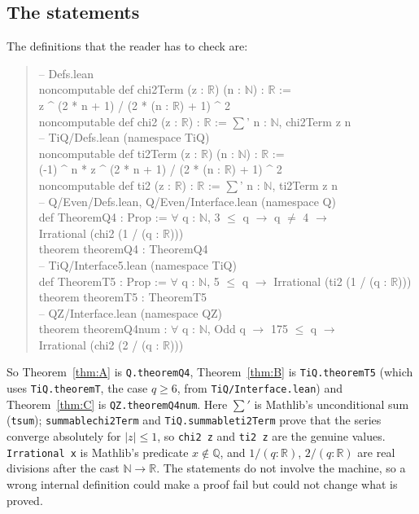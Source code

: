\documentclass[11pt]{amsart}
\theoremstyle{definition}
\theoremstyle{remark}
\numberwithin{equation}{section}
\newcommand{\NN}{\mathbb{N}}
\newcommand{\QQ}{\mathbb{Q}}
\newcommand{\RR}{\mathbb{R}}
\newcommand{\lean}[1]{{\def\_{\textunderscore\allowbreak}\texttt{#1}}}
\begin{document}
\subsection{The statements}
The definitions that the reader has to check are:
\begin{quote}\ttfamily\footnotesize
-- Defs.lean\\
noncomputable def chi2Term (z : $\mathbb{R}$) (n : $\mathbb{N}$) : $\mathbb{R}$ :=\\
\hspace*{2em}z \^{} (2 * n + 1) / (2 * (n : $\mathbb{R}$) + 1) \^{} 2\\
noncomputable def chi2 (z : $\mathbb{R}$) : $\mathbb{R}$ := $\sum$' n : $\mathbb{N}$, chi2Term z n\\[2pt]
-- TiQ/Defs.lean (namespace TiQ)\\
noncomputable def ti2Term (z : $\mathbb{R}$) (n : $\mathbb{N}$) : $\mathbb{R}$ :=\\
\hspace*{2em}(-1) \^{} n * z \^{} (2 * n + 1) / (2 * (n : $\mathbb{R}$) + 1) \^{} 2\\
noncomputable def ti2 (z : $\mathbb{R}$) : $\mathbb{R}$ := $\sum$' n : $\mathbb{N}$, ti2Term z n\\[2pt]
-- Q/Even/Defs.lean, Q/Even/Interface.lean (namespace Q)\\
def TheoremQ4 : Prop := $\forall$ q : $\mathbb{N}$, 3 $\le$ q $\to$ q $\ne$ 4 $\to$\\
\hspace*{2em}Irrational (chi2 (1 / (q : $\mathbb{R}$)))\\
theorem theoremQ4 : TheoremQ4\\[2pt]
-- TiQ/Interface5.lean (namespace TiQ)\\
def TheoremT5 : Prop := $\forall$ q : $\mathbb{N}$, 5 $\le$ q $\to$ Irrational (ti2 (1 / (q : $\mathbb{R}$)))\\
theorem theoremT5 : TheoremT5\\[2pt]
-- QZ/Interface.lean (namespace QZ)\\
theorem theoremQ4num : $\forall$ q : $\mathbb{N}$, Odd q $\to$ 175 $\le$ q $\to$\\
\hspace*{2em}Irrational (chi2 (2 / (q : $\mathbb{R}$)))
\end{quote}
So Theorem~\ref{thm:A} is \lean{Q.theoremQ4}, Theorem~\ref{thm:B} is \lean{TiQ.theoremT5} (which uses \lean{TiQ.theoremT}, the case $q\ge6$, from \lean{TiQ\slash{}Interface.lean}) and Theorem~\ref{thm:C} is
\lean{QZ.theoremQ4num}. Here $\sum'$ is Mathlib's unconditional sum (\lean{tsum}); \lean{summable\_chi2Term} and
\lean{TiQ.summable\_ti2Term} prove that the series converge absolutely for $|z|\le1$, so \lean{chi2 z} and \lean{ti2 z}
are the genuine values. \lean{Irrational x} is Mathlib's predicate $x\notin\QQ$, and $1/(q:\RR)$, $2/(q:\RR)$ are real
divisions after the cast $\NN\to\RR$. The statements do not involve the machine, so a wrong internal definition could
make a proof fail but could not change what is proved.
\end{document}
